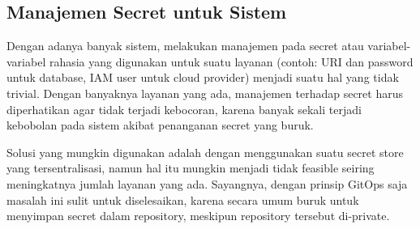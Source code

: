 \subsection{Manajemen Secret untuk Sistem}

Dengan adanya banyak sistem, melakukan manajemen pada secret atau variabel-variabel rahasia yang digunakan untuk suatu layanan (contoh: URI dan password untuk database, IAM user untuk cloud provider) menjadi suatu hal yang tidak trivial. Dengan banyaknya layanan yang ada, manajemen terhadap secret harus diperhatikan agar tidak terjadi kebocoran, karena banyak sekali terjadi kebobolan pada sistem akibat penanganan secret yang buruk.

Solusi yang mungkin digunakan adalah dengan menggunakan suatu secret store yang tersentralisasi, namun hal itu mungkin menjadi tidak feasible seiring meningkatnya jumlah layanan yang ada. Sayangnya, dengan prinsip GitOps saja masalah ini sulit untuk diselesaikan, karena secara umum buruk untuk menyimpan secret dalam repository, meskipun repository tersebut di-private.